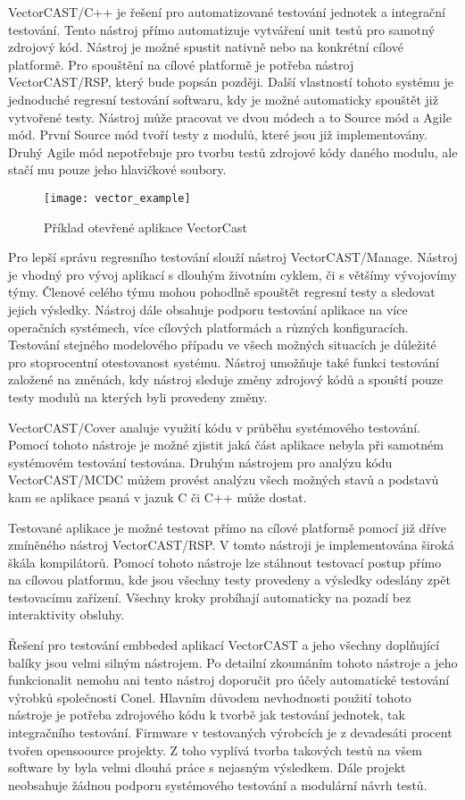 VectorCAST/C++ je řešení pro automatizované testování jednotek a integrační testování. Tento nástroj přímo automatizuje vytváření unit testů pro samotný zdrojový kód. Nástroj je možné spustit nativně nebo na konkrétní cílové platformě. Pro spouštění na cílové platformě je potřeba nástroj VectorCAST/RSP, který bude popsán později. Další vlastností tohoto systému je jednoduché regresní testování softwaru, kdy je možné automaticky spouštět již vytvořené testy. Nástroj může pracovat ve dvou módech a to Source mód a Agile mód. První Source mód tvoří testy z modulů, které jsou již implementovány. Druhý Agile mód nepotřebuje pro tvorbu testů zdrojové kódy daného modulu, ale stačí mu pouze jeho hlavičkové soubory.

\begin{figure}[h]
  \centering
  \texttt{[image: vector\_example]}
  \caption{Příklad otevřené aplikace VectorCast}
  \label{fig:vector_example}
\end{figure}

Pro lepší správu regresního testování slouží nástroj VectorCAST/Manage. Nástroj je vhodný pro vývoj aplikací s dlouhým životním cyklem, či s většímy vývojovímy týmy. Členové celého týmu mohou pohodlně spouštět regresní testy a sledovat jejich výsledky. Nástroj dále obsahuje podporu testování aplikace na více operačních systémech, více cílových platformách a různých konfiguracích. Testování stejného modelového případu ve všech možných situacích je důležité pro stoprocentní otestovanost systému. Nástroj umožňuje také funkci testování založené na změnách, kdy nástroj sleduje změny zdrojový kódů a spouští pouze testy modulů na kterých byli provedeny změny.

VectorCAST/Cover analuje využití kódu v průběhu systémového testování. Pomocí tohoto nástroje je možné zjistit jaká část aplikace nebyla při samotném systémovém testování testována. Druhým nástrojem pro analýzu kódu VectorCAST/MCDC můžem provést analýzu všech možných stavů a podstavů kam se aplikace psaná v jazuk C či C++ může dostat.

Testované aplikace je možné testovat přímo na cílové platformě pomocí již dříve zmíněného nástroj VectorCAST/RSP. V tomto nástroji je implementována široká škála kompilátorů. Pomocí tohoto nástroje lze stáhnout testovací postup přímo na cílovou platformu, kde jsou všechny testy provedeny a výsledky odeslány zpět testovacímu zařízení. Všechny kroky probíhají automaticky na pozadí bez interaktivity obsluhy.

Řešení pro testování embbeded aplikací VectorCAST a jeho všechny doplňující balíky jsou velmi silným nástrojem. Po detailní zkoumáním tohoto nástroje a jeho funkcionalit nemohu ani tento nástroj doporučit pro účely automatické testování výrobků společnosti Conel. Hlavním důvodem nevhodnosti použití tohoto nástroje je potřeba zdrojového kódu k tvorbě jak testování jednotek, tak integračního testování. Firmware v testovaných výrobcích je z devadesáti procent tvořen opensoource projekty. Z toho vyplívá tvorba takových testů na všem software by byla velmi dlouhá práce s nejasným výsledkem. Dále projekt neobsahuje žádnou podporu systémového testování a modulární návrh testů.

